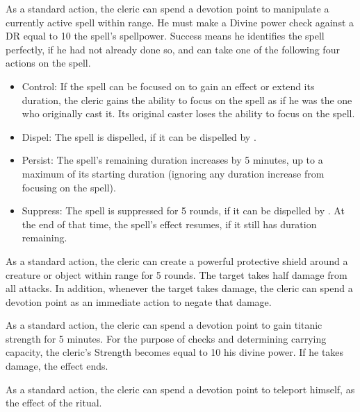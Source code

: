             As a standard action, the cleric can spend a devotion point to manipulate a currently active spell within \rngmed range.
            He must make a Divine power check against a DR equal to 10 \add the spell's spellpower.
            Success means he identifies the spell perfectly, if he had not already done so, and can take one of the following four actions on the spell.
            \begin{itemize}
                \item Control: If the spell can be focused on to gain an effect or extend its duration, the cleric gains the ability to focus on the spell as if he was the one who originally cast it.
                    Its original caster loses the ability to focus on the spell.
                \item Dispel: The spell is dispelled, if it can be dispelled by .
                \item Persist: The spell's remaining duration increases by 5 minutes, up to a maximum of its starting duration (ignoring any duration increase from focusing on the spell).
                \item Suppress: The spell is suppressed for 5 rounds, if it can be dispelled by .
                    At the end of that time, the spell's effect resumes, if it still has duration remaining.
            \end{itemize}

            As a standard action, the cleric can create a powerful protective shield around a creature or object within \rngclose range for 5 rounds.
            The target takes half damage from all attacks.
            In addition, whenever the target takes damage, the cleric can spend a devotion point as an immediate action to negate that damage.

            As a standard action, the cleric can spend a devotion point to gain titanic strength for 5 minutes.
            For the purpose of checks and determining carrying capacity, the cleric's Strength becomes equal to 10 \add his divine power.
            If he takes damage, the effect ends.

            As a standard action, the cleric can spend a devotion point to teleport himself, as the effect of the  ritual.

